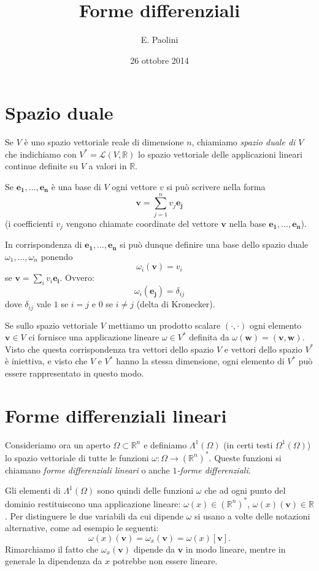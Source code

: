 \documentclass[italian,a4paper]{scrartcl}
\title{Forme differenziali}
\author{E. Paolini}
\date{26 ottobre 2014}
\newcommand{\RR}{{\mathbb R}}
\newcommand{\defeq}{=}
\renewcommand{\vec}{\mathbf}
\begin{document}
\maketitle

\section{Spazio duale}

Se $V$ è uno spazio vettoriale reale di dimensione $n$, chiamiamo
\emph{spazio duale di $V$} che indichiamo con $V^* =
\mathcal L (V,\RR)$ lo spazio vettoriale delle applicazioni lineari
continue definite su $V$ a valori in $\RR$.

Se $\vec{e_1},\dots, \vec{e_n}$ è una base di $V$ ogni vettore $v$ si può scrivere
nella forma
\[
  \vec v = \sum_{j=1}^n v_j \vec {e_j}
\]
(i coefficienti $v_j$ vengono chiamate coordinate del vettore $\vec v$
nella base $\vec{e_1},\dots, \vec{e_n}$).

In corrispondenza di $\vec{e_1},\dots, \vec{e_n}$ si può dunque definire una base
dello spazio duale $\omega_1,\dots,\omega_n$ ponendo
\[
  \omega_i (\vec v) \defeq v_i
\]
se $\vec v = \sum_i v_i \vec{e_i}$.
Ovvero:
\[
  \omega_i(\vec{e_j}) = \delta_{ij}
\]
dove $\delta_{ij}$ vale $1$ se $i=j$ e $0$ se $i\neq j$ (delta di
Kronecker).

Se sullo spazio vettoriale $V$ mettiamo un prodotto scalare $(\cdot
,\cdot)$ ogni elemento $\vec v\in V$ ci fornisce una applicazione lineare
$\omega \in V^*$ definita da $\omega(\vec w) = (\vec v,\vec w)$. Visto che questa
corrispondenza tra vettori dello spazio $V$ e vettori dello spazio
$V^*$ è iniettiva, e visto che $V$ e $V^*$ hanno la stessa dimensione,
ogni elemento di $V^*$ può essere rappresentato in questo modo.

\section{Forme differenziali lineari}

Consideriamo ora un aperto $\Omega\subset \RR^n$ e definiamo
$\Lambda^1(\Omega)$ (in certi testi $\Omega^1(\Omega)$) lo spazio
vettoriale di tutte le funzioni $\omega\colon \Omega \to (\RR^n)^*$.
Queste funzioni si chiamano \emph{forme differenziali lineari} o
anche \emph{$1$-forme differenziali}.

Gli elementi di $\Lambda^1(\Omega)$ sono quindi delle funzioni
$\omega$ che ad
ogni punto del dominio restituiscono una applicazione lineare:
$\omega(x) \in (\RR^n)^*$, $\omega(x)(\vec v) \in \RR$. Per distinguere le
due variabili da cui dipende $\omega$ si usano a volte delle notazioni
alternative, come ad esempio le seguenti:
\[
\omega(x)(\vec v) = \omega_x(\vec v) = \omega(x)[\vec v].
\]
Rimarchiamo il fatto che $\omega_x(\vec v)$ dipende da $\vec v$ in modo
lineare, mentre in generale la dipendenza da $x$ potrebbe non essere lineare.
\end{document}
